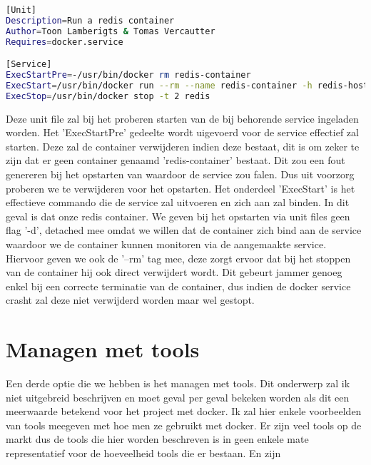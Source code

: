 \begin{lstlisting}[language=bash, style=configstyle]
[Unit]
Description=Run a redis container
Author=Toon Lamberigts & Tomas Vercautter
Requires=docker.service

[Service]
ExecStartPre=-/usr/bin/docker rm redis-container
ExecStart=/usr/bin/docker run --rm --name redis-container -h redis-host redis
ExecStop=/usr/bin/docker stop -t 2 redis
\end{lstlisting}

Deze unit file zal bij het proberen starten van de bij behorende service ingeladen worden. Het 'ExecStartPre' gedeelte wordt uigevoerd voor de service effectief zal starten. Deze zal de container verwijderen indien deze bestaat, dit is om zeker te zijn dat er geen container genaamd 'redis-container' bestaat. Dit zou een fout genereren bij het opstarten van waardoor de service zou falen. Dus uit voorzorg proberen we te verwijderen voor het opstarten. Het onderdeel 'ExecStart' is het effectieve commando die de service zal uitvoeren en zich aan zal binden. In dit geval is dat onze redis container. We geven bij het opstarten via unit files geen flag '-d', detached mee omdat we willen dat de container zich bind aan de service waardoor we de container kunnen monitoren via de aangemaakte service. Hiervoor geven we ook de '--rm' tag mee, deze zorgt ervoor dat bij het stoppen van de container hij ook direct verwijdert wordt. Dit gebeurt jammer genoeg enkel bij een correcte terminatie van de container, dus indien de docker service crasht zal deze niet verwijderd worden maar wel gestopt.

\section{Managen met tools}

Een derde optie die we hebben is het managen met tools. Dit onderwerp zal ik niet uitgebreid beschrijven en moet geval per geval bekeken worden als dit een meerwaarde betekend voor het project met docker. Ik zal hier enkele voorbeelden van tools meegeven met hoe men ze gebruikt met docker. Er zijn veel tools op de markt dus de tools die hier worden beschreven is in geen enkele mate representatief voor de hoeveelheid tools die er bestaan. En zijn 
